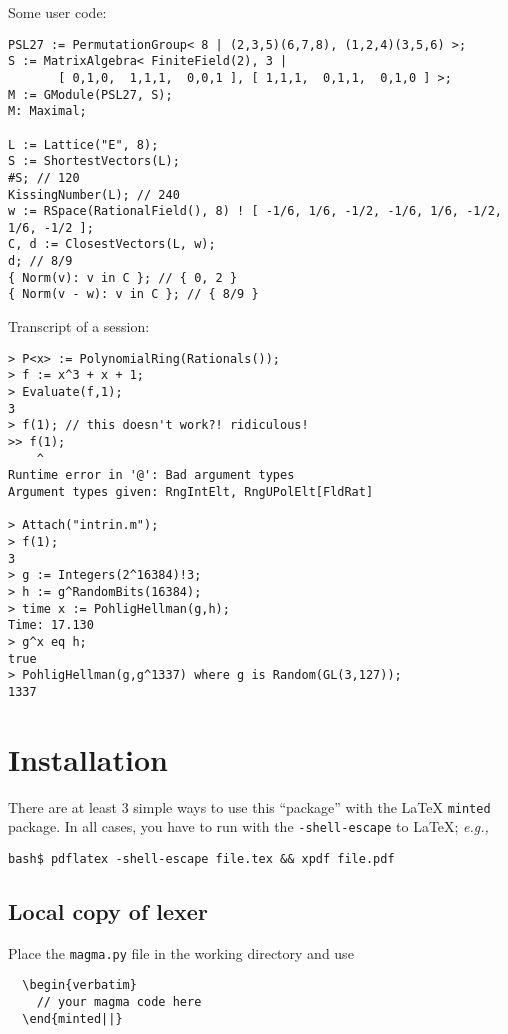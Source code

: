 \documentclass{article}
\begin{document}
Some user code:

\begin{verbatim}
PSL27 := PermutationGroup< 8 | (2,3,5)(6,7,8), (1,2,4)(3,5,6) >;
S := MatrixAlgebra< FiniteField(2), 3 |
       [ 0,1,0,  1,1,1,  0,0,1 ], [ 1,1,1,  0,1,1,  0,1,0 ] >;
M := GModule(PSL27, S);
M: Maximal;

L := Lattice("E", 8);
S := ShortestVectors(L);
#S; // 120
KissingNumber(L); // 240
w := RSpace(RationalField(), 8) ! [ -1/6, 1/6, -1/2, -1/6, 1/6, -1/2, 1/6, -1/2 ];
C, d := ClosestVectors(L, w);
d; // 8/9
{ Norm(v): v in C }; // { 0, 2 }
{ Norm(v - w): v in C }; // { 8/9 }
\end{verbatim}

Transcript of a session:

\begin{verbatim}
> P<x> := PolynomialRing(Rationals());
> f := x^3 + x + 1;
> Evaluate(f,1);
3
> f(1); // this doesn't work?! ridiculous!
>> f(1);
    ^
Runtime error in '@': Bad argument types
Argument types given: RngIntElt, RngUPolElt[FldRat]

> Attach("intrin.m");
> f(1);
3
> g := Integers(2^16384)!3;
> h := g^RandomBits(16384);
> time x := PohligHellman(g,h);
Time: 17.130
> g^x eq h;
true
> PohligHellman(g,g^1337) where g is Random(GL(3,127));
1337
\end{verbatim}


\section{Installation}

There are at least 3 simple ways to use this ``package'' with the
{\LaTeX} \texttt{minted} package. In all cases, you have to run with
the \texttt{-shell-escape} to \LaTeX{}; \textit{e.g.,}
%
\begin{verbatim}
bash$ pdflatex -shell-escape file.tex && xpdf file.pdf
\end{verbatim}


\subsection{Local copy of lexer}

Place the \texttt{magma.py} file in the working directory and use

\begin{verbatim}
  \begin{verbatim}
    // your magma code here
  \end{minted||}
\end{verbatim}
\end{document}
